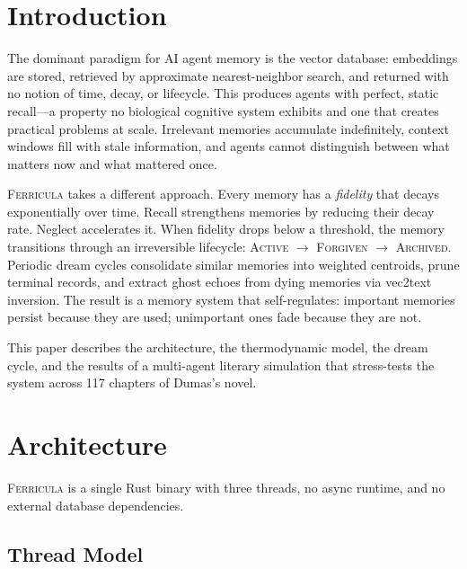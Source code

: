 \documentclass[twocolumn,10pt]{article}
\begin{document}
\section{Introduction}

The dominant paradigm for AI agent memory is the vector database:
embeddings are stored, retrieved by approximate nearest-neighbor search,
and returned with no notion of time, decay, or lifecycle.  This produces
agents with perfect, static recall---a property no biological cognitive
system exhibits and one that creates practical problems at scale.
Irrelevant memories accumulate indefinitely, context windows fill with
stale information, and agents cannot distinguish between what matters now
and what mattered once.

\textsc{Ferricula} takes a different approach.  Every memory has a
\textit{fidelity} that decays exponentially over time.  Recall
strengthens memories by reducing their decay rate.  Neglect accelerates
it.  When fidelity drops below a threshold, the memory transitions
through an irreversible lifecycle: \textsc{Active} $\to$
\textsc{Forgiven} $\to$ \textsc{Archived}.  Periodic dream cycles
consolidate similar memories into weighted centroids, prune terminal
records, and extract ghost echoes from dying memories via vec2text
inversion.  The result is a memory system that self-regulates: important
memories persist because they are used; unimportant ones fade because
they are not.

This paper describes the architecture, the thermodynamic model, the
dream cycle, and the results of a multi-agent literary simulation that
stress-tests the system across 117 chapters of Dumas's novel.

\section{Architecture}

\textsc{Ferricula} is a single Rust binary with three threads, no async
runtime, and no external database dependencies.

\subsection{Thread Model}
\end{document}
